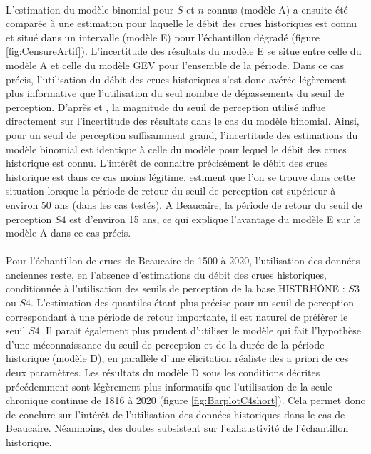 \documentclass[11pt]{article}
\begin{document}
	\paragraph{} L'estimation du modèle binomial pour $S$ et $n$ connus (modèle A) a ensuite été comparée à une estimation pour laquelle le débit des crues historiques est connu et situé dans un intervalle (modèle E) pour l'échantillon dégradé (figure \ref{fig:CensureArtif}). L'incertitude des résultats du modèle E se situe entre celle du modèle A et celle du modèle GEV pour l'ensemble de la période. Dans ce cas précis, l'utilisation du débit des crues historiques s'est donc avérée légèrement plus informative que l'utilisation du seul nombre de dépassements du seuil de perception. D'après \citet{stedinger_flood_1986} et \citet{payrastre_usefulness_2011}, la magnitude du seuil de perception utilisé influe directement sur l'incertitude des résultats dans le cas du modèle binomial. Ainsi, pour un seuil de perception suffisamment grand, l'incertitude des estimations du modèle binomial est identique à celle du modèle pour lequel le débit des crues historique est connu. L'intérêt de connaitre précisément le débit des crues historique est dans ce cas moins légitime. \citet{payrastre_usefulness_2011} estiment que l'on se trouve dans cette situation lorsque la période de retour du seuil de perception est supérieur à environ 50 ans (dans les cas testés). A Beaucaire, la période de retour du seuil de perception $S4$ est d'environ 15 ans, ce qui explique l'avantage du modèle E sur le modèle A dans ce cas précis.
	
		\paragraph{}Pour l'échantillon de crues de Beaucaire de 1500 à 2020, l'utilisation des données anciennes reste, en l'absence d'estimations du débit des crues historiques, conditionnée à l'utilisation des seuils de perception de la base HISTRHÔNE : $S3$ ou $S4$. L'estimation des quantiles étant plus précise pour un seuil de perception correspondant à une période de retour importante, il est naturel de préférer le seuil $S4$. Il parait également plus prudent d'utiliser le modèle qui fait l'hypothèse d'une méconnaissance du seuil de perception et de la durée de la période historique (modèle D), en parallèle d'une élicitation réaliste des a priori de ces deux paramètres. Les résultats du modèle D sous les conditions décrites précédemment sont légèrement plus informatifs que l'utilisation de la seule chronique continue de 1816 à 2020 (figure \ref{fig:BarplotC4short}). Cela permet donc de conclure sur l'intérêt de l'utilisation des données historiques dans le cas de Beaucaire. Néanmoins, des doutes subsistent sur l'exhaustivité de l'échantillon historique. 
	
\end{document}
